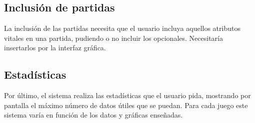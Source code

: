 \documentclass[a4paper, 11pt]{article}
\begin{document}
\subsection{Inclusión de partidas}
La inclusión de las partidas necesita que el usuario incluya aquellos atributos vitales en una partida, pudiendo o no incluir los opcionales. Necesitaría insertarlos por la interfaz gráfica.

\subsection{Estadísticas}
Por último, el sistema realiza las estadísticas que el usuario pida, mostrando por pantalla el máximo número de datos útiles que se puedan. Para cada juego este sistema varía en función de los datos y gráficas enseñadas. 
	
\end{document}
